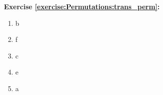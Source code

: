 \noindent\textbf{Exercise \ref{exercise:Permutations:trans_perm}:}
\begin{multicols}{5}
\begin{enumerate}[{a.}]
\item
b

\item
f

\item
c

\item
e

\item
a
\end{enumerate}
\end{multicols}

